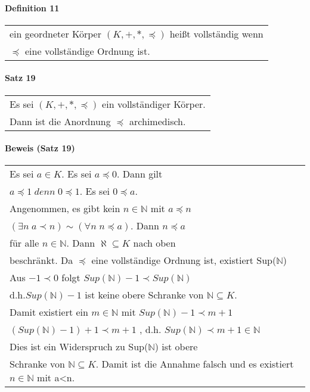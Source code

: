 \documentclass[a4paper]{scrartcl}
\begin{document}
\paragraph{Definition 11}
\begin{tabbing}
\begin{tabular}{l}
ein geordneter Körper $(K,+,*,\preceq )$ heißt vollständig wenn\\
$\preceq$ eine vollständige Ordnung ist.
\end{tabular}
\end{tabbing}

\paragraph{Satz 19}
\begin{tabbing}
\begin{tabular}{l}
Es sei $(K,+,*,\preceq)$ ein vollständiger Körper.\\
Dann ist die Anordnung $\preceq$ archimedisch.
\end{tabular}
\end{tabbing}

\paragraph{Beweis (Satz 19)}
\begin{tabbing}
\begin{tabular}{l}
Es sei $a \in K$. Es sei $a \preceq 0$. Dann gilt \\
$a \preceq 1 \; denn\; 0 \preceq 1$. Es sei $0 \preceq a$.\\
Angenommen, es gibt kein $n \in \mathbb{N} $ mit $a \preceq n$ \\
$ (\exists n\;a \prec n) \sim (\forall n\;n\preceq a)$. Dann $n\preceq a$ \\
für alle $n\in \mathbb{N} $. Dann $ \aleph \subseteq K $ nach oben\\
beschränkt. Da $\preceq$ eine vollständige Ordnung ist, existiert 
Sup($ \mathbb{N} $)\\
Aus $ -1 \prec 0 $ folgt $Sup(\mathbb{N}) -1 \prec Sup(\mathbb{N})$ \\
d.h.$Sup(\mathbb{N})-1$ ist keine obere Schranke von $\mathbb{N} \subseteq K$. \\
Damit existiert ein $m\in \mathbb{N}$ mit $Sup(\mathbb{N})-1 \prec m+1$ \\
$(Sup(\mathbb{N})-1 )+1\prec m+1$ , d.h. $Sup(\mathbb{N})\prec m+1 \in \mathbb{N}$\\
Dies ist ein Widerspruch zu Sup($\mathbb{N}$) ist obere\\
Schranke von $\mathbb{N} \subseteq K$. Damit ist die Annahme falsch und es existiert $n\in \mathbb{N}$ mit a<n.
\end{tabular}
\end{tabbing}
\end{document}
